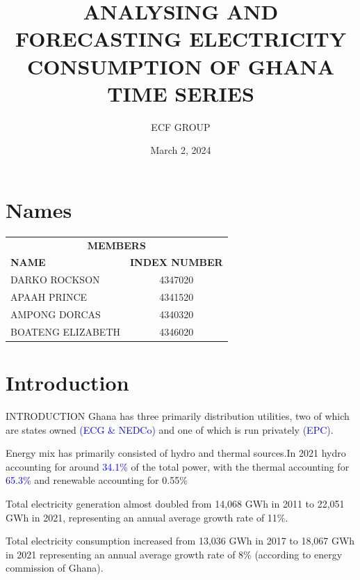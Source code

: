 \documentclass{beamer}
\title{ ANALYSING AND FORECASTING ELECTRICITY CONSUMPTION OF GHANA TIME SERIES}
\author{ECF GROUP}
\institute{Kwame Nkrumah University of Science and Technology}
\date{March 2, 2024}
\begin{document}
	\newcommand{\highlight}{blue}
	
	\begin{frame}
		\titlepage
	\end{frame}
	
	\begin{frame}
		\tableofcontents
	\end{frame}
	
	\section{Names}
	\begin{frame}
		\begin{table}
			\begin{tabular}{lc}
				\multicolumn{2}{c}{\textbf{MEMBERS}}  \vspace{10pt}    \\
				\textbf{NAME}     & \textbf{INDEX NUMBER} \vspace{10pt}  \\
				DARKO ROCKSON     & 4347020               \\
				APAAH PRINCE      & 4341520               \\
				AMPONG DORCAS     & 4340320               \\
				BOATENG ELIZABETH & 4346020              
			\end{tabular}
		\end{table}
	\end{frame}
	
	
	\section{Introduction}
	\begin{frame}{INTRODUCTION}
		Ghana has three primarily distribution utilities, two of which are states owned \textcolor{\highlight}{(ECG \& NEDCo)} and one of which is run privately \textcolor{\highlight}{(EPC)}. \vspace{10pt} \pause
		
		Energy mix has primarily consisted of hydro and thermal sources.In 2021 hydro accounting for around \textcolor{\highlight}{34.1\%} of the total power, with the thermal accounting for \textcolor{\highlight}{65.3\%} and renewable accounting for 0.55\% \vspace{10pt} \pause
		
		Total electricity generation almost doubled from 14,068 GWh in 2011 to 22,051 GWh in 2021, representing an annual average growth rate of 11\%. \vspace{10pt} \pause
		
		Total electricity consumption increased from 13,036 GWh in 2017 to 18,067 GWh in 2021 representing an annual average growth rate of 8\% (according to energy commission of Ghana).
	\end{frame}
	
\end{document}
